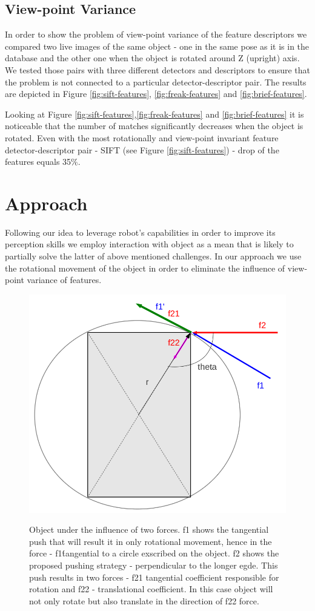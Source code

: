 \subsection{View-point Variance}

In order to show the problem of view-point variance of the feature descriptors we compared two live images of the same object - one in the same pose as it is in the database and the other one when the object is rotated around Z (upright) axis. We tested those pairs with three different detectors and descriptors to ensure that the problem is not connected to a particular detector-descriptor pair. The results are depicted in Figure \ref{fig:sift-features}, \ref{fig:freak-features} and \ref{fig:brief-features}.

Looking at Figure \ref{fig:sift-features},\ref{fig:freak-features} and \ref{fig:brief-features} it is noticeable that the number of matches significantly decreases when the object is rotated. Even with the most rotationally and view-point invariant feature detector-descriptor pair - SIFT (see Figure \ref{fig:sift-features}) - drop of the features equals 35$\%$.



\section{Approach}

Following our idea to leverage robot's capabilities in order to improve its perception skills we employ interaction with object as a mean that is likely to partially solve the latter of above mentioned challenges. In our approach we use the rotational movement of the object in order to eliminate the influence of view-point variance of features.

\begin{figure}

\includegraphics[width=0.5\columnwidth]{figures/rectangle-angle.png}\\


\caption{Object under the influence of two forces. f1 shows the tangential push that will result it in only rotational movement, hence in the force - f1\' tangential to a circle exscribed on the object. f2 shows the proposed pushing strategy - perpendicular to the longer egde. This push results in two forces - f21 tangential coefficient responsible for rotation and f22 - translational coefficient. In this case object will not only rotate but also translate in the direction of f22 force.  }
\label{fig:angles-rectangle}
\end{figure}



